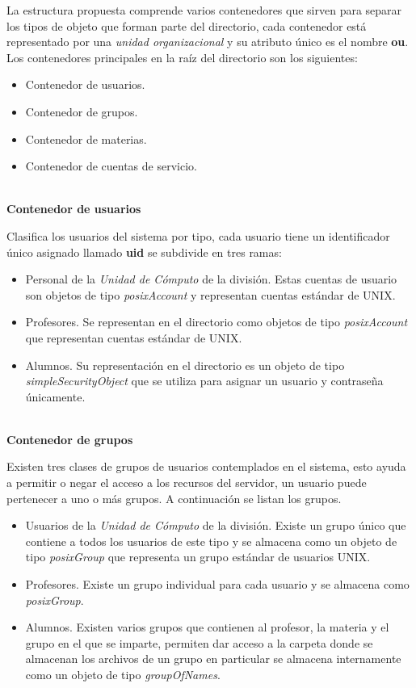 La estructura propuesta comprende varios contenedores que sirven para separar los tipos de objeto que forman parte del directorio, cada contenedor est\'{a} representado por una \textit{unidad organizacional} y su atributo \'{u}nico es el nombre \textbf{ou}. Los contenedores principales en la ra\'{i}z del directorio son los siguientes:

\begin{itemize}
  \item Contenedor de usuarios.
  \item Contenedor de grupos.
  \item Contenedor de materias.
  \item Contenedor de cuentas de servicio.
\end{itemize}

\textbf{\\ Contenedor de usuarios \\}

Clasifica los usuarios del sistema por tipo, cada usuario tiene un identificador \'{u}nico asignado llamado \textbf{uid} se subdivide en tres ramas:

\begin{itemize}
  \item Personal de la \textit{Unidad de C\'{o}mputo} de la divisi\'{o}n.
  Estas cuentas de usuario son objetos de tipo \textit{posixAccount} y representan cuentas est\'{a}ndar de \textsc{UNIX}.
  \item Profesores.
  Se representan en el directorio como objetos de tipo \textit{posixAccount} que representan cuentas est\'{a}ndar de \textsc{UNIX}.
  \item Alumnos.
  Su representaci\'{o}n en el directorio es un objeto de tipo \textit{simpleSecurityObject} que se utiliza para asignar un usuario y contrase\~{n}a \'{u}nicamente.
\end{itemize}

\textbf{\\ Contenedor de grupos \\}

Existen tres clases de grupos de usuarios contemplados en el sistema, esto ayuda a permitir o negar el acceso a los recursos del servidor, un usuario puede pertenecer a uno o m\'{a}s grupos. A continuaci\'{o}n se listan los grupos.

\begin{itemize}
  \item Usuarios de la \textit{Unidad de C\'{o}mputo} de la divisi\'{o}n.
  Existe un grupo \'{u}nico que contiene a todos los usuarios de este tipo y se almacena como un objeto de tipo \textit{posixGroup} que representa un grupo est\'{a}ndar de usuarios \textsc{UNIX}.
  \item Profesores.
  Existe un grupo individual para cada usuario y se almacena como \textit{posixGroup}.
  \item Alumnos.
  Existen varios grupos que contienen al profesor, la materia y el grupo en el que se imparte, permiten dar acceso a la carpeta donde se almacenan los archivos de un grupo en particular se almacena internamente como un objeto de tipo \textit{groupOfNames}.
\end{itemize}

